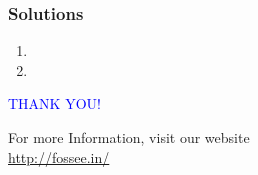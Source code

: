 \documentclass[12pt,compress]{beamer}
\begin{document}
\begin{frame}
\frametitle{Solutions}
\label{sec-14}

\begin{enumerate}
\item 
\vspace{15pt}
\item 
\end{enumerate}
\end{frame}
\begin{frame}

\begin{block}{}
  \begin{center}
  \textcolor{blue}{\Large THANK YOU!} 
  \end{center}
  \end{block}
\begin{block}{}
  \begin{center}
    For more Information, visit our website\\
    \url{http://fossee.in/}
  \end{center}  
  \end{block}
\end{frame}
\end{document}
